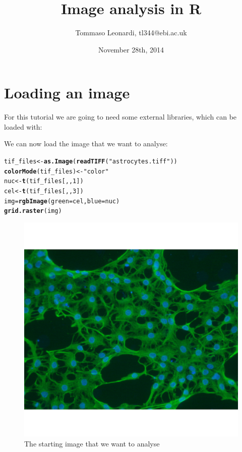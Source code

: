 \documentclass{article}\usepackage[]{graphicx}\usepackage[]{color}
\makeatletter
\def\maxwidth{ %
  \ifdim\Gin@nat@width>\linewidth
    \linewidth
  \else
    \Gin@nat@width
  \fi
}
\newcommand{\hlnum}[1]{\textcolor[rgb]{0.686,0.059,0.569}{#1}}%
\newcommand{\hlstr}[1]{\textcolor[rgb]{0.192,0.494,0.8}{#1}}%
\newcommand{\hlstd}[1]{\textcolor[rgb]{0.345,0.345,0.345}{#1}}%
\newcommand{\hlkwb}[1]{\textcolor[rgb]{0.69,0.353,0.396}{#1}}%
\newcommand{\hlkwc}[1]{\textcolor[rgb]{0.333,0.667,0.333}{#1}}%
\newcommand{\hlkwd}[1]{\textcolor[rgb]{0.737,0.353,0.396}{\textbf{#1}}}%
\newenvironment{kframe}{%
 \def\at@end@of@kframe{}%
 \ifinner\ifhmode%
  \def\at@end@of@kframe{\end{minipage}}%
  \begin{minipage}{\columnwidth}%
 \fi\fi%
 \def\FrameCommand##1{\hskip\@totalleftmargin \hskip-\fboxsep
 \colorbox{shadecolor}{##1}\hskip-\fboxsep
     \hskip-\linewidth \hskip-\@totalleftmargin \hskip\columnwidth}%
 \MakeFramed {\advance\hsize-\width
   \@totalleftmargin\z@ \linewidth\hsize
   \@setminipage}}%
 {\par\unskip\endMakeFramed%
 \at@end@of@kframe}
\newenvironment{knitrout}{}{} %
\makeatother
\begin{document}
\title{Image analysis in R}
\author{Tommaso Leonardi, tl344@ebi.ac.uk}
\date{November 28th, 2014}
\maketitle
\tableofcontents
\section{Loading an image}
For this tutorial we are going to need some external libraries, which can be loaded with:


We can now load the image that we want to analyse:
\begin{knitrout}
\color{fgcolor}\begin{kframe}
\begin{alltt}
\hlstd{tif_files} \hlkwb{<-} \hlkwd{as.Image}\hlstd{(}\hlkwd{readTIFF}\hlstd{(}\hlstr{"astrocytes.tiff"}\hlstd{))}
\hlkwd{colorMode}\hlstd{(tif_files)} \hlkwb{<-} \hlstr{"color"}
\hlstd{nuc} \hlkwb{<-} \hlkwd{t}\hlstd{(tif_files[,,}\hlnum{1}\hlstd{])}
\hlstd{cel} \hlkwb{<-} \hlkwd{t}\hlstd{(tif_files[,,}\hlnum{3}\hlstd{])}
\hlstd{img} \hlkwb{=} \hlkwd{rgbImage}\hlstd{(}\hlkwc{green}\hlstd{=cel,} \hlkwc{blue}\hlstd{=nuc)}
\hlkwd{grid.raster}\hlstd{(img)}
\end{alltt}
\end{kframe}\begin{figure}

{\centering \includegraphics[width=\maxwidth]{knit_figure/figfull_image-1} 

}

\caption[The starting image that we want to analyse]{The starting image that we want to analyse\label{fig:full.image}}
\end{figure}


\end{knitrout}
\end{document}
